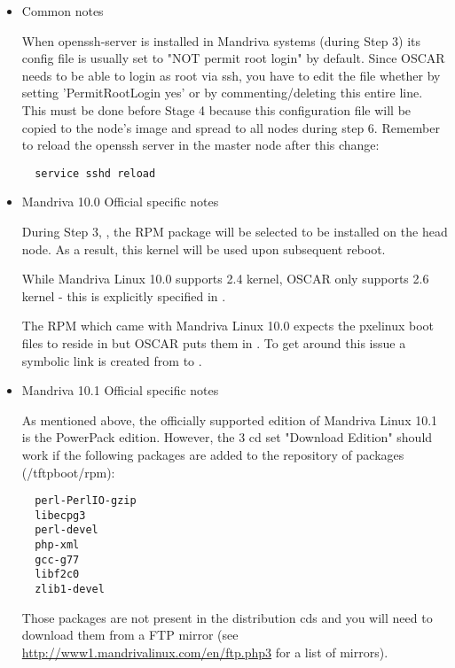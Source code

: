 \begin{itemize}

\item Common notes

When openssh-server is installed in Mandriva systems (during Step 3)
its config file is usually set to "NOT permit root login" by default.
Since OSCAR needs to be able to login as root via ssh, you have to edit the
file  whether by setting 
'PermitRootLogin yes' or by commenting/deleting this entire line. This must 
be done before Stage 4 because this configuration file will be copied to the 
node's image and spread to all nodes during step 6. Remember to reload
the openssh server in the master node after this change:
\begin{verbatim}
  service sshd reload
\end{verbatim}

\item Mandriva 10.0 Official specific notes

During Step 3, , the RPM package
 will be selected to be installed on the head node.
As a result, this kernel will be used upon subsequent reboot.

While Mandriva Linux 10.0 supports 2.4 kernel, OSCAR only supports
2.6 kernel - this is explicitly specified in
.

The  RPM which came with Mandriva Linux 10.0 expects the
pxelinux boot files to reside in  but OSCAR puts
them in .  To get around this issue a symbolic link is
created from  to .


\item Mandriva 10.1 Official specific notes

As mentioned above, the officially supported edition of Mandriva Linux 10.1
is the PowerPack edition. However, the 3 cd set "Download Edition"
should work if the following packages are added to the repository of 
packages (/tftpboot/rpm):
\begin{verbatim}
  perl-PerlIO-gzip
  libecpg3
  perl-devel
  php-xml
  gcc-g77
  libf2c0
  zlib1-devel
\end{verbatim} 
Those packages are not present in the distribution cds and you will need to
download them from a FTP mirror (see \url{http://www1.mandrivalinux.com/en/ftp.php3}
for a list of mirrors).


\end{itemize}
